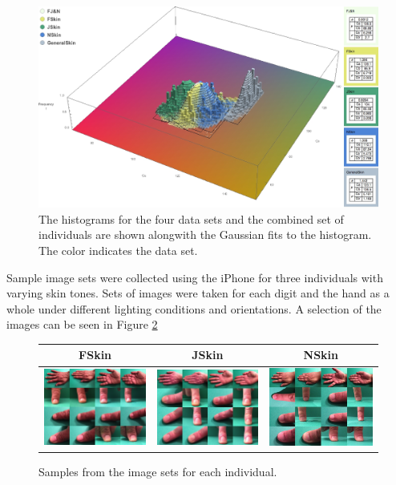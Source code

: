 \begin{figure}[h!]
  \centering
    \includegraphics[width=\textwidth]{Chapter3/Figs/All_Together_3D.jpg}
    \caption{The histograms for the four data sets and the combined set of individuals are shown alongwith the Gaussian fits to the histogram. The color indicates the data set.}  \label{fig:AllTogether3D}
\end{figure}

Sample image sets were collected using the iPhone for three individuals with varying skin tones. Sets of images were taken for each digit and the hand as a whole under different lighting conditions and orientations. A selection of the images can be seen in Figure \ref{fig:SetSamples}


\begin{figure}[h!]
  \centering
  \begin{tabular}{||c||c||c||}
  \hline \rule[-2ex]{0pt}{5.5ex}  FSkin &  JSkin & NSkin \\ 
  \hline \rule[-2ex]{0pt}{5.5ex} 
  \includegraphics[width=0.3 \textwidth]{Chapter3/Figs/SampleCollages/FSkin_Sample.jpg} & 
  \includegraphics[width=0.3 \textwidth]{Chapter3/Figs/SampleCollages/JSkin_Sample.jpg} &  
  \includegraphics[width=0.3 \textwidth]{Chapter3/Figs/SampleCollages/NSkin_Sample.jpg}\\ 
  \hline 
  \end{tabular} 
    \caption{Samples from the image sets for each individual.}  \label{fig:SetSamples}
\end{figure}

